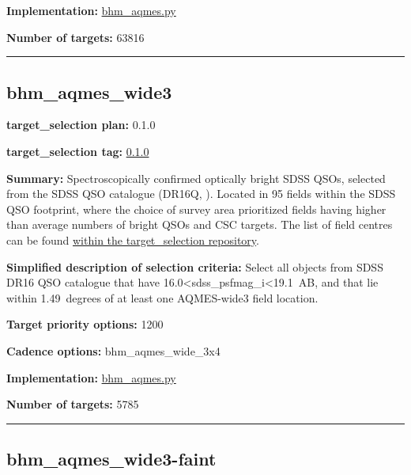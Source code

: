 \noindent\textbf{Implementation:}
\href{https://github.com/sdss/target_selection/blob/0.1.0/python/target_selection/cartons/bhm_aqmes.py}{bhm\_aqmes.py}

\noindent\textbf{Number of targets:} 63816

\begin{center}\rule{0.5\linewidth}{0.5pt}\end{center}

\hypertarget{bhm_aqmes_wide3_plan0.1.0}{%
\subsection{bhm\_aqmes\_wide3}\label{bhm_aqmes_wide3_plan0.1.0}}

\noindent\textbf{target\_selection plan:} 0.1.0

\noindent\textbf{target\_selection tag:}
\href{https://github.com/sdss/target_selection/tree/0.1.0/}{0.1.0}

\noindent\textbf{Summary:} Spectroscopically confirmed optically bright SDSS
QSOs, selected from the SDSS QSO catalogue (DR16Q,
\citealt{Lyke2020}). Located in 95 fields within the SDSS QSO footprint,
where the choice of survey area prioritized fields having higher than
average numbers of bright QSOs and CSC targets. The list of field
centres can be found
\href{https://github.com/sdss/target_selection/blob/0.1.0/python/target_selection/masks/candidate_target_fields_bhm_aqmes_wide_v0.2.1.fits}{within
the target\_selection repository}.

\noindent\textbf{Simplified description of selection criteria:} Select all
objects from SDSS DR16 QSO catalogue that have
16.0\textless sdss\_psfmag\_i\textless19.1~AB, and that lie within
1.49~degrees of at least one AQMES-wide3 field location.


\noindent\textbf{Target priority options:} 1200

\noindent\textbf{Cadence options:} bhm\_aqmes\_wide\_3x4

\noindent\textbf{Implementation:}
\href{https://github.com/sdss/target_selection/blob/0.1.0/python/target_selection/cartons/bhm_aqmes.py}{bhm\_aqmes.py}

\noindent\textbf{Number of targets:} 5785

\begin{center}\rule{0.5\linewidth}{0.5pt}\end{center}

\hypertarget{bhm_aqmes_wide3-faint_plan0.1.0}{%
\subsection{bhm\_aqmes\_wide3-faint}\label{bhm_aqmes_wide3-faint_plan0.1.0}}

